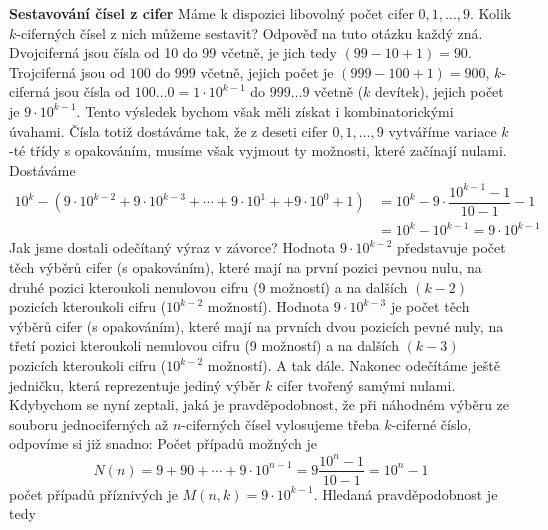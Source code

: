 \wikitextrule
\begin{example}\label{mai:exam054}
  \textbf{Sestavování čísel z cifer}\newline\small
   Máme k dispozici libovolný počet cifer \(0, 1, \ldots, 9\). Kolik \(k\)-ciferných čísel z nich 
   můžeme sestavit? Odpověď na tuto otázku každý zná. Dvojciferná jsou čísla od \num{10} do 
   \num{99} včetně, je jich tedy \((99 - 10 + 1) = 90\). Trojciferná jsou od \(100\) do \(999\) 
   včetně, jejich počet je \((999 - 100 + 1) = 900\), \(k\)-ciferná jsou čísla od \(100\ldots0 = 
   1\cdot10^{k-1}\) do \(999\ldots9\) včetně (\(k\) devítek), jejich počet je \(9\cdot10^{k-1}\). 
   Tento výsledek bychom však měli získat i kombinatorickými úvahami. Čísla totiž dostáváme tak, že 
   z deseti cifer \(0, 1,\ldots, 9\) vytváříme variace \(k\)-té třídy s opakováním, musíme však 
   vyjmout ty možnosti, které začínají nulami. Dostáváme
   \begin{align*}
     10^k - 
       \left(
         9\cdot10^{k-2} + 9\cdot10^{k-3} + \cdots + 9\cdot10^1 + + 9\cdot10^0 + 1 
       \right)
        &= 10^k - 9\cdot\dfrac{10^{k-1} - 1}{10 - 1} - 1     \\
        &= 10^k - 10^{k-1} = 9\cdot10^{k-1}
   \end{align*}
   Jak jsme dostali odečítaný výraz v závorce? Hodnota \(9\cdot10^{k-2}\) představuje počet těch 
   výběrů cifer (s opakováním), které mají na první pozici pevnou nulu, na druhé pozici kteroukoli 
   nenulovou cifru (\num{9} možností) a na dalších \((k - 2)\) pozicích kteroukoli cifru 
   (\(10^{k-2}\) možností). Hodnota \(9\cdot10^{k-3}\) je počet těch výběrů cifer (s opakováním), 
   které mají na prvních dvou pozicích pevné nuly, na třetí pozici kteroukoli nenulovou cifru 
   (\num{9} možností) a na dalších \((k - 3)\) pozicích kteroukoli cifru (\(10^{k-2}\) možností). A 
   tak dále. Nakonec odečítáme ještě jedničku, která reprezentuje jediný výběr \(k\) cifer tvořený 
   samými nulami. Kdybychom se nyní zeptali, jaká je pravděpodobnost, že při náhodném výběru ze 
   souboru jednociferných až \(n\)-ciferných čísel vylosujeme třeba \(k\)-ciferné číslo, odpovíme 
   si již snadno: Počet případů možných je
   \begin{equation*}
     N(n) =9 + 90 + \cdots + 9\cdot10^{n-1} = 9\dfrac{10^n-1}{10 - 1} = 10^n - 1
   \end{equation*}
   počet případů příznivých je  \(M(n,k) = 9\cdot10^{k-1}\). Hledaná pravděpodobnost je tedy
   \begin{equation*}

\end{equation*}
\end{example}
